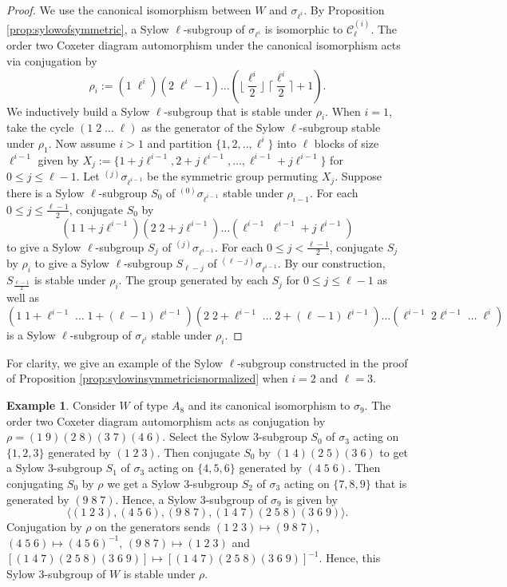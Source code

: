\documentclass[12pt]{amsart}
\theoremstyle{plain}
\theoremstyle{definition}
\numberwithin{equation}{section}
\newtheorem{example}[theorem]{Example}
\numberwithin{equation}{section}
\begin{document}
	\begin{proof}
		We use the canonical isomorphism between $W$ and $\sigma_{\ell^i}$. By Proposition \ref{prop:sylowofsymmetric}, a Sylow $\ell$-subgroup of $\sigma_{\ell^i}$ is isomorphic to $\mathcal{C}_{\ell}^{(i)}$. The order two Coxeter diagram automorphism under the canonical isomorphism acts via conjugation by \[\rho_i:=(1 \; \ell^i)(2 \; \ell^i-1)\dots (\lfloor\frac{\ell^i}{2}\rfloor \; \lceil\frac{\ell^i}{2}\rceil+1).\] We inductively build a Sylow $\ell$-subgroup that is stable under $\rho_i$. When $i=1$, take the cycle $(1 \; 2 \; \dots \; \ell)$ as the generator of the Sylow $\ell$-subgroup stable under $\rho_1$. Now assume $i>1$ and partition $\{1,2,..,\ell^i\}$ into $\ell$ blocks of size $\ell^{i-1}$ given by $X_j:=\{1+j\ell^{i-1},2+j\ell^{i-1},\dots,\ell^{i-1}+j\ell^{i-1}\}$ for $0\leq j\leq \ell-1$. Let $^{(j)}\sigma_{\ell^{i-1}}$ be the symmetric group permuting $X_j$. Suppose there is a Sylow $\ell$-subgroup $S_0$ of $^{(0)}\sigma_{\ell^{i-1}}$ stable under $\rho_{i-1}$. For each $0\leq j\leq \frac{\ell-1}{2}$, conjugate $S_0$ by \[(1\;1+j\ell^{i-1})(2\;2+j\ell^{i-1})\dots(\ell^{i-1}\;\ell^{i-1}+j\ell^{i-1})\] to give a Sylow $\ell$-subgroup $S_j$ of $^{(j)}\sigma_{\ell^{i-1}}$. For each $0\leq j< \frac{\ell-1}{2}$, conjugate $S_j$ by $\rho_i$ to give a Sylow $\ell$-subgroup $S_{\ell-j}$ of $^{(\ell-j)}\sigma_{\ell^{i-1}}$. By our construction, $S_{\frac{\ell-1}{2}}$ is stable under $\rho_i$. The group generated by each $S_j$ for $0\leq j\leq \ell-1$ as well as \[(1\; 1+\ell^{i-1} \; \dots \; 1+(\ell-1)\ell^{i-1})(2\; 2+\ell^{i-1} \; \dots \; 2+(\ell-1)\ell^{i-1})\dots(\ell^{i-1} \; 2\ell^{i-1}\;\dots\;\ell^i)\] is a Sylow $\ell$-subgroup of $\sigma_{\ell^i}$ stable under $\rho_i$.
	\end{proof}
	
	For clarity, we give an example of the Sylow $\ell$-subgroup constructed in the proof of Proposition \ref{prop:sylowinsymmetricisnormalized} when $i=2$ and $\ell=3$.
	
	\begin{example}
		Consider $W$ of type $A_8$ and its canonical isomorphism to $\sigma_{9}$. The order two Coxeter diagram automorphism acts as conjugation by $\rho=(1\;9)(2\;8)(3\;7)(4\;6)$. Select the Sylow $3$-subgroup $S_0$ of $\sigma_3$ acting on $\{1,2,3\}$ generated by $(1\; 2 \; 3)$. Then conjugate $S_0$ by $(1\; 4)(2\;5)(3\;6)$ to get a Sylow $3$-subgroup $S_1$ of $\sigma_3$ acting on $\{4,5,6\}$ generated by $(4\; 5 \; 6)$. Then conjugating $S_0$ by $\rho$ we get a Sylow $3$-subgroup $S_2$ of $\sigma_3$ acting on $\{7,8,9\}$ that is generated by $(9\;8\;7)$. Hence, a Sylow $3$-subgroup of $\sigma_9$ is given by \[\langle(1\;2\;3),(4\;5\;6),(9\;8\;7),(1\;4\;7)(2\;5\;8)(3\;6\;9)\rangle.\] Conjugation by $\rho$ on the generators sends $(1\;2\;3)\mapsto (9\;8\;7)$, $(4\;5\;6)\mapsto(4\;5\;6)^{-1}$, $(9\;8\;7)\mapsto (1\;2\;3)$ and $[(1\;4\;7)(2\;5\;8)(3\;6\;9)]\mapsto[(1\;4\;7)(2\;5\;8)(3\;6\;9)]^{-1}$. Hence, this Sylow $3$-subgroup of $W$ is stable under $\rho$.
	\end{example}
	
\end{document}
